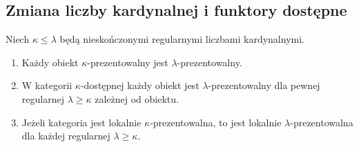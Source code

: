 \subsection{Zmiana liczby kardynalnej i funktory dostępne}

\begin{stwierdzenie}\label{cat:prop:accessible-increase-cardinal}
Niech $\kappa\leq\lambda$ będą nieskończonymi regularnymi liczbami kardynalnymi.
\begin{enumerate}
 \item Każdy obiekt $\kappa$-prezentowalny jest $\lambda$-prezentowalny.
 \item W kategorii $\kappa$-dostępnej każdy obiekt jest $\lambda$-prezentowalny dla pewnej regularnej $\lambda\geq\kappa$ zależnej od obiektu.
 \item Jeżeli kategoria jest lokalnie $\kappa$-prezentowalna, to jest lokalnie $\lambda$-prezentowalna dla każdej regularnej $\lambda\geq\kappa$.
\end{enumerate}
\end{stwierdzenie}
